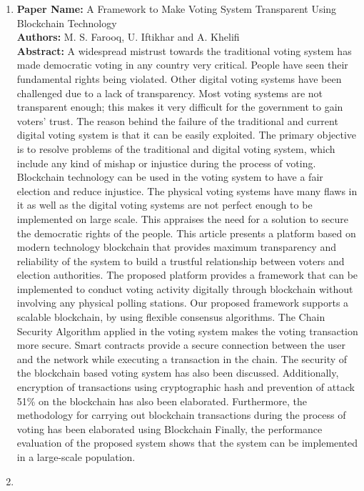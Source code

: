 \documentclass[a4paper, oneside, 12pt]{book}
\begin{document}
			\begin{enumerate}
				\item
					\textbf{Paper Name:} A Framework to Make Voting System Transparent Using Blockchain Technology\\
					\textbf{Authors:} M. S. Farooq, U. Iftikhar and A. Khelifi\\
					\textbf{Abstract:} A widespread mistrust towards the traditional voting system has made democratic voting in any country very critical. People have seen their fundamental rights being violated. Other digital voting systems have been challenged due to a lack of transparency. Most voting systems are not transparent enough; this makes it very difficult for the government to gain voters’ trust. The reason behind the failure of the traditional and current digital voting system is that it can be easily exploited. The primary objective is to resolve problems of the traditional and digital voting system, which include any kind of mishap or injustice during the process of voting. Blockchain technology can be used in the voting system to have a fair election and reduce injustice. The physical voting systems have many flaws in it as well as the digital voting systems are not perfect enough to be implemented on large scale. This appraises the need for a solution to secure the democratic rights of the people. This article presents a platform based on modern technology blockchain that provides maximum transparency and reliability of the system to build a trustful relationship between voters and election authorities. The proposed platform provides a framework that can be implemented to conduct voting activity digitally through blockchain without involving any physical polling stations. Our proposed framework supports a scalable blockchain, by using flexible consensus algorithms. The Chain Security Algorithm applied in the voting system makes the voting transaction more secure. Smart contracts provide a secure connection between the user and the network while executing a transaction in the chain. The security of the blockchain based voting system has also been discussed. Additionally, encryption of transactions using cryptographic hash and prevention of attack 51\% on the blockchain has also been elaborated. Furthermore, the methodology for carrying out blockchain transactions during the process of voting has been elaborated using Blockchain Finally, the performance evaluation of the proposed system shows that the system can be implemented in a large-scale population.
				\item

\end{enumerate}
\end{document}
